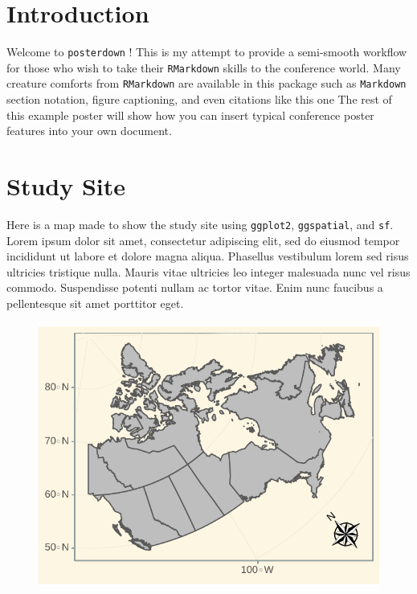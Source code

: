 \documentclass[article,30pt,extrafontsizes]{memoir}
\begin{document}
\begin{adjmulticols*}{4}{10mm}{10mm}
\normalsize{  %
\color{bodytextcol}
\section{Introduction}\label{introduction}

Welcome to \texttt{posterdown} ! This is my attempt to provide a
semi-smooth workflow for those who wish to take their \texttt{RMarkdown}
skills to the conference world. Many creature comforts from
\texttt{RMarkdown} are available in this package such as
\texttt{Markdown} section notation, figure captioning, and even
citations like this one \autocite{holden_identifying_2012} The rest of
this example poster will show how you can insert typical conference
poster features into your own document.

\section{Study Site}\label{study-site}

Here is a map made to show the study site using \texttt{ggplot2},
\texttt{ggspatial}, and \texttt{sf}. Lorem ipsum dolor sit amet,
\autocite{middleton_geological_nodate} consectetur adipiscing elit, sed
do eiusmod tempor incididunt ut labore et dolore magna aliqua. Phasellus
vestibulum lorem sed risus ultricies tristique nulla. Mauris vitae
ultricies leo integer malesuada nunc vel risus commodo. Suspendisse
potenti nullam ac tortor vitae. Enim nunc faucibus a pellentesque sit
amet porttitor eget.

\begin{figure}

{\centering \includegraphics[width=0.8\linewidth]{skeleton_files/figure-latex/unnamed-chunk-2-1} 

}
\end{figure}}
\end{adjmulticols*}
\end{document}
